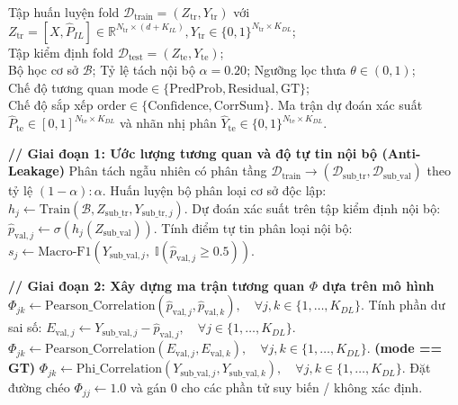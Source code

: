 \documentclass[11pt,a4paper]{article}
\begin{document}
\begin{algorithm}[htbp]
\caption{Quy trình Ước lượng Tương quan Mô hình và Huấn luyện Chuỗi Thưa MA-SCC}
\label{alg:model_aware_scc}
\begin{algorithmic}[1]
\Require 
  Tập huấn luyện fold $\mathcal{D}_{\text{train}} = (Z_{\text{tr}}, Y_{\text{tr}})$ với $Z_{\text{tr}} = [X, \hat{P}_{IL}] \in \mathbb{R}^{N_{\text{tr}} \times (d + K_{IL})}, Y_{\text{tr}} \in \{0, 1\}^{N_{\text{tr}} \times K_{DL}}$; \\
  Tập kiểm định fold $\mathcal{D}_{\text{test}} = (Z_{\text{te}}, Y_{\text{te}})$; \\
  Bộ học cơ sở $\mathcal{B}$; Tỷ lệ tách nội bộ $\alpha = 0.20$; Ngưỡng lọc thưa $\theta \in (0, 1)$; \\
  Chế độ tương quan $\text{mode} \in \{\text{PredProb}, \text{Residual}, \text{GT}\}$; \\
  Chế độ sắp xếp $\text{order} \in \{\text{Confidence}, \text{CorrSum}\}$.
\Ensure 
  Ma trận dự đoán xác suất $\hat{P}_{\text{te}} \in [0, 1]^{N_{\text{te}} \times K_{DL}}$ và nhãn nhị phân $\hat{Y}_{\text{te}} \in \{0, 1\}^{N_{\text{te}} \times K_{DL}}$.

\vspace{0.3em}
\Statex \textbf{// Giai đoạn 1: Ước lượng tương quan và độ tự tin nội bộ (Anti-Leakage)}
\State Phân tách ngẫu nhiên có phân tầng $\mathcal{D}_{\text{train}} \to (\mathcal{D}_{\text{sub\_tr}}, \mathcal{D}_{\text{sub\_val}})$ theo tỷ lệ $(1 - \alpha) : \alpha$.
    \State Huấn luyện bộ phân loại cơ sở độc lập: $h_j \leftarrow \text{Train}(\mathcal{B}, Z_{\text{sub\_tr}}, Y_{\text{sub\_tr}, j})$.
    \State Dự đoán xác suất trên tập kiểm định nội bộ: $\hat{p}_{\text{val}, j} \leftarrow \sigma(h_j(Z_{\text{sub\_val}}))$.
    \State Tính điểm tự tin phân loại nội bộ: $s_j \leftarrow \text{Macro-F1}\left(Y_{\text{sub\_val}, j}, \; \mathbb{I}(\hat{p}_{\text{val}, j} \ge 0.5)\right)$.
\EndFor

\vspace{0.3em}
\Statex \textbf{// Giai đoạn 2: Xây dựng ma trận tương quan $\Phi$ dựa trên mô hình}
    \State $\Phi_{jk} \leftarrow \text{Pearson\_Correlation}(\hat{p}_{\text{val}, j}, \hat{p}_{\text{val}, k}), \quad \forall j, k \in \{1, \dots, K_{DL}\}$.
    \State Tính phần dư sai số: $E_{\text{val}, j} \leftarrow Y_{\text{sub\_val}, j} - \hat{p}_{\text{val}, j}, \quad \forall j \in \{1, \dots, K_{DL}\}$.
    \State $\Phi_{jk} \leftarrow \text{Pearson\_Correlation}(E_{\text{val}, j}, E_{\text{val}, k}), \quad \forall j, k \in \{1, \dots, K_{DL}\}$.
\Else \textbf{ (mode == GT)}
    \State $\Phi_{jk} \leftarrow \text{Phi\_Correlation}(Y_{\text{sub\_val}, j}, Y_{\text{sub\_val}, k}), \quad \forall j, k \in \{1, \dots, K_{DL}\}$.
\EndIf
\State Đặt đường chéo $\Phi_{jj} \leftarrow 1.0$ và gán 0 cho các phần tử suy biến / không xác định.


\end{algorithmic}
\end{algorithm}
\end{document}
